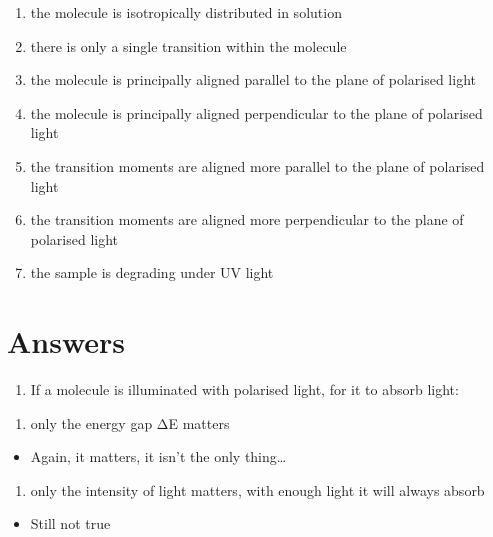 \documentclass[
]{book}
\providecommand{\tightlist}{%
  \setlength{\itemsep}{0pt}\setlength{\parskip}{0pt}}
\begin{document}
\begin{enumerate}
\def\labelenumi{\alph{enumi}.}
\tightlist
\item
  the molecule is isotropically distributed in solution
\item
  there is only a single transition within the molecule
\item
  the molecule is principally aligned parallel to the plane of polarised light
\item
  the molecule is principally aligned perpendicular to the plane of polarised light
\item
  the transition moments are aligned more parallel to the plane of polarised light
\item
  the transition moments are aligned more perpendicular to the plane of polarised light
\item
  the sample is degrading under UV light
\end{enumerate}

\hypertarget{answers-1}{%
\section{Answers}\label{answers-1}}

\begin{enumerate}
\def\labelenumi{\arabic{enumi}.}
\tightlist
\item
  If a molecule is illuminated with polarised light, for it to absorb light:
\end{enumerate}

\begin{enumerate}
\def\labelenumi{\alph{enumi}.}
\tightlist
\item
  only the energy gap ΔE matters
\end{enumerate}

\begin{itemize}
\tightlist
\item
  Again, it matters, it isn't the only thing\ldots{}
\end{itemize}

\begin{enumerate}
\def\labelenumi{\alph{enumi}.}
\setcounter{enumi}{1}
\tightlist
\item
  only the intensity of light matters, with enough light it will always absorb
\end{enumerate}

\begin{itemize}
\tightlist
\item
  Still not true
\end{itemize}
\end{document}
